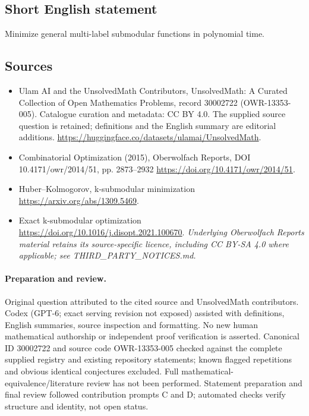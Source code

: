 \documentclass[11pt]{article}
\begin{document}
\subsection{Short English statement}
Minimize general multi-label submodular functions in polynomial time.
\subsection{Sources}
\begin{itemize}
\item[\hypertarget{source:30002722:1}{S1}] Ulam AI and the UnsolvedMath Contributors, UnsolvedMath: A Curated Collection of Open Mathematics Problems, record 30002722 (OWR-13353-005). Catalogue curation and metadata: CC BY 4.0. The supplied source question is retained; definitions and the English summary are editorial additions.
\url{https://huggingface.co/datasets/ulamai/UnsolvedMath}.
\item[\hypertarget{source:30002722:2}{S2}] Combinatorial Optimization (2015), Oberwolfach Reports, DOI 10.4171/owr/2014/51, pp. 2873--2932
\url{https://doi.org/10.4171/owr/2014/51}.
\item[\hypertarget{source:30002722:3}{S3}] Huber--Kolmogorov, k-submodular minimization
\url{https://arxiv.org/abs/1309.5469}.
\item[\hypertarget{source:30002722:4}{S4}] Exact k-submodular optimization
\url{https://doi.org/10.1016/j.disopt.2021.100670}.
\textit{Underlying Oberwolfach Reports material retains its source-specific licence, including CC BY-SA 4.0 where applicable; see THIRD\_PARTY\_NOTICES.md.}
\end{itemize}
\paragraph{Preparation and review.}
Original question attributed to the cited source and UnsolvedMath contributors. Codex (GPT-6; exact serving revision not exposed) assisted with definitions, English summaries, source inspection and formatting. No new human mathematical authorship or independent proof verification is asserted. Canonical ID 30002722 and source code OWR-13353-005 checked against the complete supplied registry and existing repository statements; known flagged repetitions and obvious identical conjectures excluded. Full mathematical-equivalence/literature review has not been performed. Statement preparation and final review followed contribution prompts C and D; automated checks verify structure and identity, not open status.
\label{end:30002722}
\end{document}
